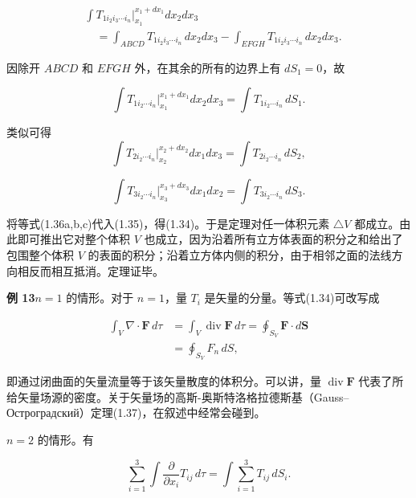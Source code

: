 \documentclass[11pt,a4paper,oneside]{ctexbook}
\newcommand{\ve}[1]{\bm{#1}}
\begin{document}
\begin{equation*}
\begin{aligned}
&\int T_{1 i_2 i_3 \cdots i_n} \Big|_{x_1}^{x_1 + dx_1} dx_2 dx_3\\
&\quad = \int_{ABCD} T_{1 i_2 i_3 \cdots i_n}\, dx_2 dx_3 - \int_{EFGH} T_{1 i_2 i_3 \cdots i_n}\, dx_2 dx_3.
\end{aligned}
\end{equation*}

因除开 $ABCD$ 和 $EFGH$ 外，在其余的所有的边界上有 $dS_1 = 0$，故

\begin{equation}
\int T_{1 i_2 \cdots i_n} \Big|_{x_1}^{x_1 + dx_1} dx_2 dx_3 = \int T_{1 i_2 \cdots i_n}\, dS_1.
\tag{1.36a}
\end{equation}

类似可得
\begin{equation}
\int T_{2 i_2 \cdots i_n} \Big|_{x_2}^{x_2 + dx_2} dx_1 dx_3 = \int T_{2 i_2 \cdots i_n}\, dS_2,
\tag{1.36b}
\end{equation}

\begin{equation}
\int T_{3 i_2 \cdots i_n} \Big|_{x_3}^{x_3 + dx_3} dx_1 dx_2 = \int T_{3 i_2 \cdots i_n}\, dS_3.
\tag{1.36c}
\end{equation}

将等式(1.36a,b,c)代入(1.35)，得(1.34)。于是定理对任一体积元素 $\triangle V$ 都成立。由此即可推出它对整个体积 $V$ 也成立，因为沿着所有立方体表面的积分之和给出了包围整个体积 $V$ 的表面的积分；沿着立方体内侧的积分，由于相邻之面的法线方向相反而相互抵消。定理证毕。

\textbf{例 13}\quad $n = 1$ 的情形。对于 $n = 1$，量 $T_i$ 是矢量的分量。等式(1.34)可改写成

\begin{equation}
\begin{aligned}
\int_{V} \nabla \cdot \ve{F}\, d\tau &= \int_{V} \operatorname{div}\ve{F}\, d\tau = \oint_{S_V} \ve{F} \cdot d\ve{S}\\
&= \oint_{S_V} F_n\, dS,
\end{aligned}
\tag{1.37}
\end{equation}

即通过闭曲面的矢量流量等于该矢量散度的体积分。可以讲，量 $\operatorname{div}\ve{F}$ 代表了所给矢量场源的密度。关于矢量场的高斯-奥斯特洛格拉德斯基（Gauss--Остроградский）定理(1.37)，在叙述中经常会碰到。

$n = 2$ 的情形。有

\begin{equation*}
\sum_{i=1}^{3} \int \frac{\partial}{\partial x_i} T_{ij}\, d\tau = \int \sum_{i=1}^{3} T_{ij}\, dS_i.
\end{equation*}
\end{document}
